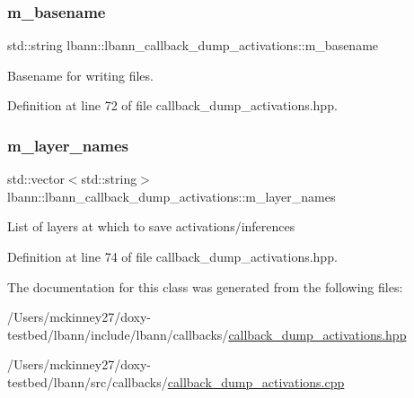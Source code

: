 \subsubsection{\texorpdfstring{m\+\_\+basename}{m\_basename}}
{\footnotesize\ttfamily std\+::string lbann\+::lbann\+\_\+callback\+\_\+dump\+\_\+activations\+::m\+\_\+basename\hspace{0.3cm}{\ttfamily [private]}}

Basename for writing files. 

Definition at line 72 of file callback\+\_\+dump\+\_\+activations.\+hpp.

\mbox{\label{classlbann_1_1lbann__callback__dump__activations_aac56e32b6bef7923046c408f3a2dc857}} 
\subsubsection{\texorpdfstring{m\+\_\+layer\+\_\+names}{m\_layer\_names}}
{\footnotesize\ttfamily std\+::vector$<$std\+::string$>$ lbann\+::lbann\+\_\+callback\+\_\+dump\+\_\+activations\+::m\+\_\+layer\+\_\+names\hspace{0.3cm}{\ttfamily [private]}}

List of layers at which to save activations/inferences 

Definition at line 74 of file callback\+\_\+dump\+\_\+activations.\+hpp.



The documentation for this class was generated from the following files\+:\begin{DoxyCompactItemize}
\item 
/\+Users/mckinney27/doxy-\/testbed/lbann/include/lbann/callbacks/\hyperlink{callback__dump__activations_8hpp}{callback\+\_\+dump\+\_\+activations.\+hpp}\item 
/\+Users/mckinney27/doxy-\/testbed/lbann/src/callbacks/\hyperlink{callback__dump__activations_8cpp}{callback\+\_\+dump\+\_\+activations.\+cpp}\end{DoxyCompactItemize}
